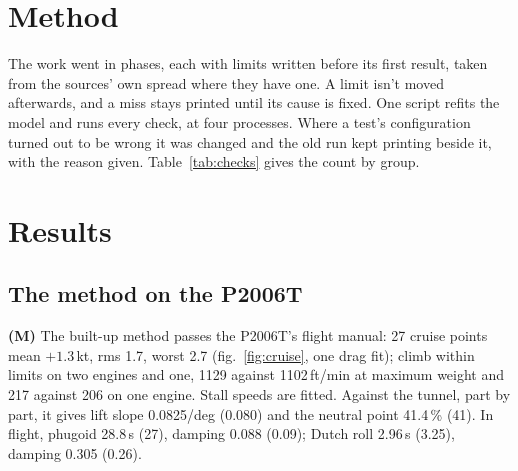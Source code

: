 \documentclass[10pt,a4paper,twocolumn]{article}
\begin{document}
\section{Method}\label{sec:method}
The work went in phases, each with limits written before its first result, taken from the sources' own spread where they have one. A limit isn't moved afterwards, and a miss stays printed until its cause is fixed. One script refits the model and runs every check, at four processes.
Where a test's configuration turned out to be wrong it was changed and the old run kept printing beside it, with the reason given. Table~\ref{tab:checks} gives the count by group.

\begin{table}[t]
\centering\small
\caption{All checks, by what they're held to: M measured, C CFD, S a simulator, D a design document.}\label{tab:checks}

\end{table}

\section{Results}\label{sec:results}
\subsection{The method on the P2006T}\label{sec:p2006t}
\textbf{(M)} The built-up method passes the P2006T's flight manual: 27 cruise points mean $+1.3$\,kt, rms 1.7, worst 2.7 (fig.~\ref{fig:cruise}, one drag fit); climb within limits on two engines and one, 1129 against 1102\,ft/min at maximum weight and 217 against 206 on one engine. Stall speeds are fitted. Against the tunnel, part by part, it gives
lift slope 0.0825/deg (0.080) and the neutral point 41.4\,\% (41). In flight, phugoid 28.8\,s (27), damping 0.088 (0.09); Dutch roll 2.96\,s (3.25), damping 0.305 (0.26).
\end{document}
